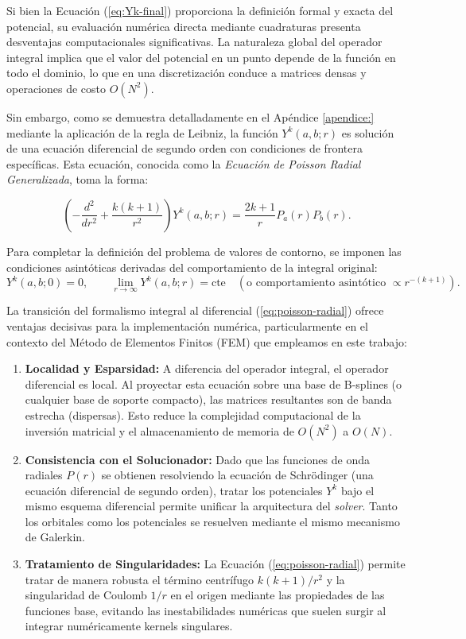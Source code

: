 Si bien la Ecuación (\cref{eq:Yk-final}) proporciona la definición formal y exacta del potencial, su evaluación numérica directa mediante cuadraturas presenta desventajas computacionales significativas. La naturaleza global del operador integral implica que el valor del potencial en un punto depende de la función en todo el dominio, lo que en una discretización conduce a matrices densas y operaciones de costo $O(N^2)$.

Sin embargo, como se demuestra detalladamente en el Apéndice \cref{apendice:} mediante la aplicación de la regla de Leibniz, la función $Y^k(a,b;r)$ es solución de una ecuación diferencial de segundo orden con condiciones de frontera específicas. Esta ecuación, conocida como la \textit{Ecuación de Poisson Radial Generalizada}, toma la forma:

\begin{equation}
\label{eq:poisson-radial}
    \left( -\frac{d^2}{dr^2} + \frac{k(k+1)}{r^2} \right) Y^k(a,b;r) = \frac{2k+1}{r} P_a(r)P_b(r).
\end{equation}

Para completar la definición del problema de valores de contorno, se imponen las condiciones asintóticas derivadas del comportamiento de la integral original:
\begin{equation}
    Y^k(a,b; 0) = 0, \quad \quad \lim_{r \to \infty} Y^k(a,b; r) = \text{cte} \quad (\text{o comportamiento asintótico } \propto r^{-(k+1)}).
\end{equation}

La transición del formalismo integral al diferencial (\cref{eq:poisson-radial}) ofrece ventajas decisivas para la implementación numérica, particularmente en el contexto del Método de Elementos Finitos (FEM) que empleamos en este trabajo:

\begin{enumerate}
    \item \textbf{Localidad y Esparsidad:} A diferencia del operador integral, el operador diferencial es local. Al proyectar esta ecuación sobre una base de B-splines (o cualquier base de soporte compacto), las matrices resultantes son de banda estrecha (dispersas). Esto reduce la complejidad computacional de la inversión matricial y el almacenamiento de memoria de $O(N^2)$ a $O(N)$.
    
    \item \textbf{Consistencia con el Solucionador:} Dado que las funciones de onda radiales $P(r)$ se obtienen resolviendo la ecuación de Schrödinger (una ecuación diferencial de segundo orden), tratar los potenciales $Y^k$ bajo el mismo esquema diferencial permite unificar la arquitectura del \textit{solver}. Tanto los orbitales como los potenciales se resuelven mediante el mismo mecanismo de Galerkin.
    
    \item \textbf{Tratamiento de Singularidades:} La Ecuación (\cref{eq:poisson-radial}) permite tratar de manera robusta el término centrífugo $k(k+1)/r^2$ y la singularidad de Coulomb $1/r$ en el origen mediante las propiedades de las funciones base, evitando las inestabilidades numéricas que suelen surgir al integrar numéricamente kernels singulares.
\end{enumerate}

